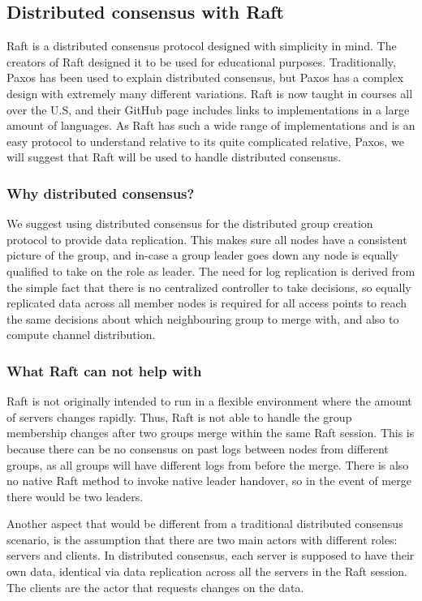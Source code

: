 \subsection{Distributed consensus with Raft}
Raft \cite{raftio} is a distributed consensus protocol designed with simplicity in mind. The creators of Raft designed it to be used for educational purposes. Traditionally, Paxos has been used to explain distributed consensus, but Paxos has a complex design with extremely many different variations. Raft is now taught in courses all over the U.S, and their GitHub page includes links
to implementations in a large amount of languages. As Raft has such a wide range of implementations and is an easy protocol to understand relative to its quite complicated relative, Paxos, 
we will suggest that Raft will be used to handle distributed consensus. 

\subsubsection{Why distributed consensus?}
We suggest using distributed consensus for the distributed group creation protocol to provide data replication.
This makes sure all nodes have a consistent picture of the group, and in-case a group leader goes down any node is equally qualified to take on the role as leader.
The need for log replication is derived from the simple fact that there is no centralized controller to take decisions, so equally replicated data across all member nodes is required for all access
points to reach the same decisions about which neighbouring group to merge with, and also to compute channel distribution.  

\subsubsection{What Raft can not help with}
Raft is not originally intended to run in a flexible environment where the amount of servers changes rapidly. Thus, Raft is not able to handle the group membership changes
after two groups merge within the same Raft session. This is because there can be no consensus on past logs between nodes from different groups, as all groups will have different logs from before the merge. There is also no native Raft method to invoke native leader handover, so in the event of merge there would be two leaders. 

Another aspect that would be different from a traditional distributed consensus scenario, is the assumption that there are two main actors with different roles: servers and clients.
In distributed consensus, each server is supposed to have their own data, identical via data replication across all the servers in the Raft session. The clients are the actor that requests 
changes on the data.

